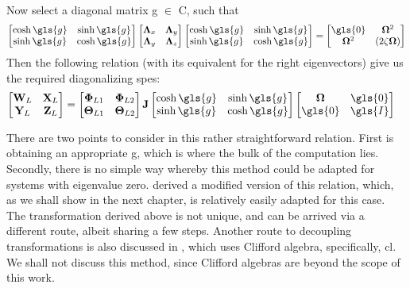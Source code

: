 Now select a diagonal matrix \gls{g} $\in$ \gls{C}, such that
\begin{align}
	\begin{bmatrix}
		\cosh{\gls{g}} & \sinh{\gls{g}}\\
		\sinh{\gls{g}} & \cosh{\gls{g}}\\
	\end{bmatrix}
	\begin{bmatrix}
		\mathbf{\Lambda}_x & \mathbf{\Lambda}_y\\
		\mathbf{\Lambda}_y & \mathbf{\Lambda}_z
	\end{bmatrix}
	\begin{bmatrix}
		\cosh{\gls{g}} & \sinh{\gls{g}}\\
		\sinh{\gls{g}} & \cosh{\gls{g}}\\
	\end{bmatrix} = 
	\begin{bmatrix}
		\gls{0} & \mathbf{\Omega}^2\\
		\mathbf{\Omega}^2 & (2\mathbf{\zeta\Omega})
	\end{bmatrix}
\end{align}
Then the following relation (with its equivalent for the right eigenvectors) 
give us the required diagonalizing \glspl{spe}:
\begin{align}
	\begin{bmatrix}
		\mathbf{W}_L & \mathbf{X}_L\\
		\mathbf{Y}_L & \mathbf{Z}_L
	\end{bmatrix} &= 
	\begin{bmatrix}
		\mathbf{\Phi}_{L1} & \mathbf{\Phi}_{L2}\\
		\mathbf{\Theta}_{L1} & \mathbf{\Theta}_{L2}
	\end{bmatrix}\mathbf{J}
	\begin{bmatrix}
		\cosh{\gls{g}} & \sinh{\gls{g}}\\
		\sinh{\gls{g}} & \cosh{\gls{g}}\\
	\end{bmatrix}
	\begin{bmatrix}
		\mathbf{\Omega} & \gls{0} \\
		\gls{0}  & \gls{I} 
	\end{bmatrix}
\end{align}

There are two points to consider in this rather straightforward relation.
First is obtaining an appropriate \gls{g}, which is where the bulk of the 
computation lies. Secondly, there is no simple way whereby this method 
could be adapted for systems with eigenvalue zero. \citet{Chu200896}
derived a modified version of this relation, which, as we shall show in the
next chapter, is relatively easily adapted for this case. The transformation 
derived above is not unique, and can be arrived via a different route, albeit 
sharing a few steps. Another route to decoupling transformations is also 
discussed in \citet{Friswell2001}, which uses Clifford algebra, specifically,
\gls{cl}. We shall not discuss this method, since Clifford algebras are 
beyond the scope of this work.
